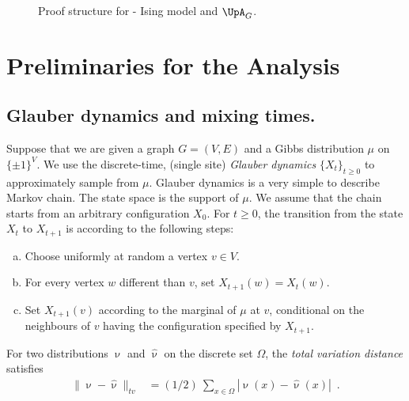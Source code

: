 \documentclass[11pt,reqno]{amsart}
\numberwithin{equation}{section}
\newcommand{\blue}[1]{{\color{blue}#1}}
\newcommand{\bluepigment}[1]{{\color{blue(pigment)}#1}}
\newcommand{\cadmiumorange}[1]{{\color{cadmiumorange}#1}}
\newcommand{\electricviolet}[1]{{\color{electricviolet}#1}}
\newcommand{\goldenbrown}[1]{{\color{goldenbrown}#1}}
\newcommand{\heliotrope}[1]{{\color{heliotrope}#1}}
\newcommand{\Glauber}{{\{X_{\kt}\}_{\kt\geq 0}}}
\newcommand{\norm}[2]{\goldenbrown{\|} #1 \goldenbrown{\|}_{#2}}
\newcommand{\tv}{tv}
\newcommand{\abs}[1]{\blue{|}#1\blue{|}}
\newcommand{\Adjacency}{{\UpA}}
\newcommand{\spreadpoint}{\newpage}
\newcommand{\LastReviewG}[1]{{\color{magenta}\hspace{.2cm} [Rev: \textrm{#1} - \bluepigment{G} ] \hspace{.2cm}}}
\renewcommand{\LastReviewG}[1]{}
\renewcommand{\spreadpoint}{}
\renewcommand{\blue}[1]{#1}
\renewcommand{\bluepigment}[1]{#1}
\renewcommand{\cadmiumorange}[1]{#1}
\renewcommand{\electricviolet}[1]{#1}
\renewcommand{\goldenbrown}[1]{#1}
\renewcommand{\heliotrope}[1]{#1}
\newcommand{\kt}{\cadmiumorange{t}}
\newcommand{\kv}{\electricviolet{v}}
\newcommand{\kw}{\blue{w}}
\newcommand{\kx}{\heliotrope{x}}
\renewcommand{\kt}{t}
\renewcommand{\kv}{v}
\renewcommand{\kw}{w}
\renewcommand{\kx}{x}
\begin{document}
\begin{figure}
 \centering
{}
		\caption{Proof structure for  - Ising model and $\Adjacency_G$.}
	\label{fig:StrctISINGAdjacency}
\end{figure}






\spreadpoint 
\section{Preliminaries for the Analysis \LastReviewG{2025-03-03}}\label{sec:Preliminaries}





\subsection{Glauber dynamics and mixing times.}\label{sec:MCMCIntroStaff}
%
Suppose that we are given a graph $G=(V,E)$ and  a Gibbs distribution $\mu$ on $\{\pm 1\}^V$. 
We use the discrete-time, (single site) {\em Glauber dynamics} 
$\Glauber$ to approximately sample from $\mu$. Glauber dynamics is a very simple to describe 
Markov chain. The state space is the support of $\mu$.
%
We assume that the chain starts from an arbitrary configuration $X_0$. For 
$\kt\geq 0$, the transition from the state $X_{\kt}$ to $X_{\kt+1}$ is according to the following steps: 

\begin{enumerate}[(a)]
%
\item Choose uniformly at random a vertex $\kv\in V$. 
%
\item For every vertex $\kw$ different than $\kv$, set $X_{\kt+1}(\kw)=X_{\kt}(\kw)$.
% 
\item Set $X_{\kt+1}(\kv)$ according to the marginal of $\mu$ at $\kv$, conditional on 
the neighbours of $\kv$ having the configuration specified by $X_{t+1}$.
\end{enumerate}


% 
For two distributions $\upnu$ and $\hat{\upnu}$ on the discrete set $\Omega$,
the {\em total variation distance} satisfies 
\begin{align}\nonumber %
\norm{\upnu-\hat{\upnu}}{\tv} &=(1/{2}) \ { \sum\nolimits_{\kx\in \Omega} }\abs{\upnu(\kx)-\hat{\upnu}(\kx)} \enspace .
\end{align}
%
\end{document}
